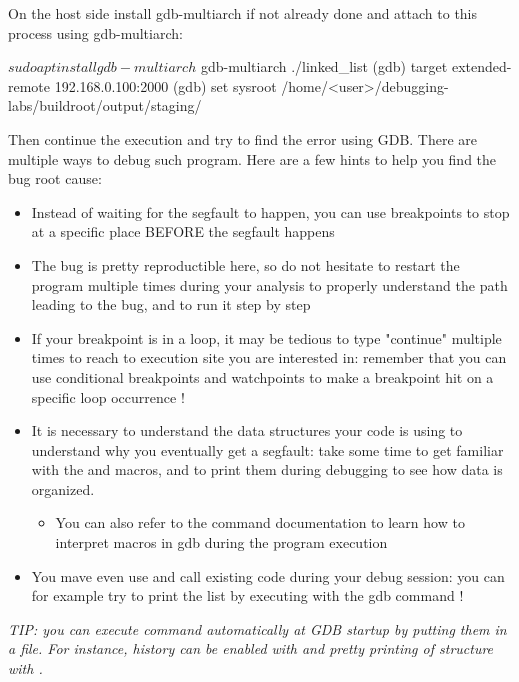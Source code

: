 
On the host side install gdb-multiarch if not already done and attach to this
process using gdb-multiarch:

\begin{bashinput}
$ sudo apt install gdb-multiarch
$ gdb-multiarch ./linked_list
(gdb) target extended-remote 192.168.0.100:2000
(gdb) set sysroot /home/<user>/debugging-labs/buildroot/output/staging/
\end{bashinput}

Then continue the execution and try to find the error using GDB. There are
multiple ways to debug such program. Here are a few hints to help you find the bug root
cause:
\begin{itemize}
  \item Instead of waiting for the segfault to happen, you can use breakpoints
  to stop at a specific place BEFORE the segfault happens
  \item The bug is pretty reproductible here, so do not hesitate to restart the
  program multiple times during your analysis to properly understand the path
  leading to the bug, and to run it step by step
  \item If your breakpoint is in a loop, it may be tedious to type "continue"
  multiple times to reach to execution site you are interested in: remember
  that you can use conditional breakpoints and watchpoints to make a breakpoint
  hit on a specific loop occurrence !
  \item It is necessary to understand the data structures your code is using to
  understand why you eventually get a segfault: take some time to get familiar
  with the  and  macros, and to print them
  during debugging to see how data is organized.
  \begin{itemize}
    \item You can also refer to the  command documentation to learn
    how to interpret macros in gdb during the program execution
  \end{itemize}
  \item You mave even use and call existing code during your debug session: you
  can for example try to print the list by executing
   with the  gdb command !
\end{itemize}

{\em TIP: you can execute command automatically at GDB startup by putting them
in a  file. For instance, history can be enabled with
 and pretty printing of structure with
.}

